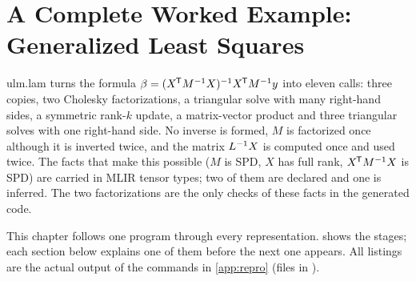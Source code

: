 \chapter{A Complete Worked Example: Generalized Least Squares}
\label{ch:gls}

\begin{answer}
ulm.lam turns the formula \(\beta=(X^{\mkern-1.5mu\mathsf{T}} M^{-1} X)^{-1} X^{\mkern-1.5mu\mathsf{T}} M^{-1} y\) into
eleven calls: three copies, two Cholesky factorizations, a triangular solve
with many right-hand sides, a symmetric rank-\(k\) update, a matrix-vector
product and three triangular solves with one right-hand side. No inverse is
formed, \(M\) is factorized once although it is inverted twice, and the
matrix \(L^{-1} X\) is computed once and used twice. The facts that make this
possible (\(M\) is SPD, \(X\) has full rank, \(X^{\mkern-1.5mu\mathsf{T}} M^{-1} X\) is SPD) are
carried in MLIR tensor types; two of them are declared and one is inferred.
The two factorizations are the only checks of these facts in the generated
code.
\end{answer}

This chapter follows one program through every representation.
 shows the stages; each section below explains one of
them before the next one appears. All listings are the actual output of the
commands in \cref{app:repro} (files in ).

